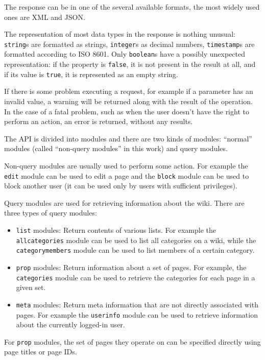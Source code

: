 The response can be in one of the several available formats, the most widely used ones are XML and JSON.

The representation of most data types in the response is nothing unusual:
\texttt{string}s are formatted as strings, \texttt{integer}s as decimal numbers,
\texttt{timestamp}s are formatted according to ISO 8601.
Only \texttt{boolean}s have a possibly unexpected representation:
if the property is \texttt{false}, it is not present in the result at all,
and if its value is \texttt{true}, it is represented as an empty string.

If there is some problem executing a request, for example if a parameter has an invalid value,
a warning will be returned along with the result of the operation.
In the case of a fatal problem, such as when the user doesn't have the right to perform an action,
an error is returned, without any results.

\medskip

The API is divided into modules and there are two kinds of modules:
“normal” modules (called “non-query modules” in this work) and query modules.

Non-query modules are usually used to perform some action.
For example the \texttt{edit} module can be used to edit a page
and the \texttt{block} module can be used to block another user (it can be used only by users with sufficient privileges).

Query modules are used for retrieving information about the wiki. There are three types of query modules:

\begin{itemize}
\item \texttt{list} modules: Return contents of various lists.
For example the \texttt{all\-categories} module can be used to list all categories on a wiki,
while the \texttt{categorymembers} module can be used to list members of a certain category.
\item \texttt{prop} modules: Return information about a set of pages.
For example, the \texttt{categories} module can be used to retrieve the categories for each page in a given set.
\item \texttt{meta} modules: Return meta information that are not directly associated with pages.
For example the \texttt{userinfo} module can be used to retrieve information about the currently logged-in user.
\end{itemize}

For \texttt{prop} modules, the set of pages they operate on can be specified directly using page titles or page IDs.

